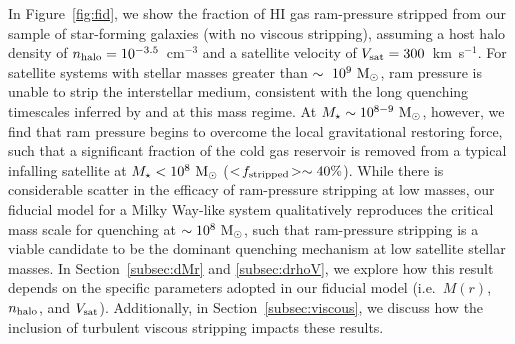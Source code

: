 \documentclass[usenatbib]{mn2e}
\newcommand{\mstar}{{M}_{\star}}
\newcommand{\msun}{{\rm M}_{\odot}}
\begin{document}
In Figure~\ref{fig:fid}, we show the fraction of H{\scriptsize I} gas
ram-pressure stripped from our sample of star-forming galaxies (with
no viscous stripping), assuming a host halo density of $n_{\rm halo} =
10^{-3.5}$~cm$^{-3}$ and a satellite velocity of $V_{\rm sat} =
300$~km~s$^{-1}$.
%
For satellite systems with stellar masses greater than
$\sim~10^{9}~\msun$, ram pressure is unable to strip the interstellar
medium, consistent with the long quenching timescales inferred by
\citet{wheeler14} and \citet{fham15} at this mass regime.
% 
At $\mstar \sim 10^{8-9}~\msun$, however, we find that ram pressure
begins to overcome the local gravitational restoring force, such that
a significant fraction of the cold gas reservoir is removed from a
typical infalling satellite at $\mstar < 10^{8}~\msun$ ($<\!f_{\rm
  stripped}\!> \sim 40\%$).
%
While there is considerable scatter in the efficacy of ram-pressure
stripping at low masses, our fiducial model for a Milky Way-like
system qualitatively reproduces the critical mass scale for quenching
at $\sim10^{8}~\msun$, such that ram-pressure stripping is a viable
candidate to be the dominant quenching mechanism at low satellite
stellar masses.
%
In Section~\ref{subsec:dMr} and \ref{subsec:drhoV}, we explore how
this result depends on the specific parameters adopted in our fiducial
model (i.e.~$M(r)$, $n_{\rm halo}$, and $V_{\rm sat}$). Additionally,
in Section~\ref{subsec:viscous}, we discuss how the inclusion of
turbulent viscous stripping impacts these results.

\end{document}
